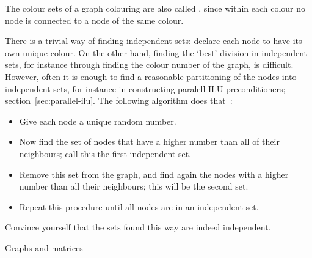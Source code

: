 The colour sets of a graph colouring are also called
, since within each colour no node is
connected to a node of the same colour.

There is a trivial way of finding independent sets: declare each node
to have its own unique colour. On the other hand, finding the `best'
division in independent sets, for instance through finding the colour
number of the graph, is difficult. However, often it is enough to find
a reasonable partitioning of the nodes into independent sets, for
instance in constructing paralell ILU preconditioners;
section~\ref{sec:parallel-ilu}. The following algorithm does
that~\cite{jopl94,Luby:parallel}:
\begin{itemize}
\item Give each node a unique random number.
\item Now find the set of nodes that have a higher number than all of
  their neighbours; call this the first independent set.
\item Remove this set from the graph, and find again the nodes with a
  higher number than all their neighbours; this will be the second
  set.
\item Repeat this procedure until all nodes are in an independent set.
\end{itemize}
\begin{exercise}
  Convince yourself that the sets found this way are indeed independent.
\end{exercise}


 {Graphs and matrices}

